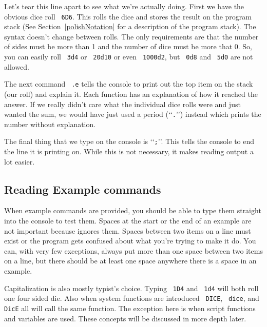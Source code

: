 Let's tear this line apart to see what we're actually doing. First we have
the obvious dice roll \texttt{ 6D6}. This rolls the dice and stores the result
on the program stack (See Section~\ref{polishNotation} for a description of
the program stack). The syntax doesn't change between rolls. The only 
requirements are that the number of sides must be more than 1
and the number of dice must
be more that 0. So, you can easily roll \texttt{ 3d4} or \texttt{ 20d10} or even
\texttt{ 1000d2}, but \texttt{ 0d8} and \texttt{ 5d0} are not allowed.

The next command \texttt{ .e}
tells the console to print out the top item on the stack (our roll)
and explain it. Each function has an explanation of how it reached the answer.
If we really didn't care what the individual dice rolls were and just wanted
the sum, we would have just used a period (\lq\lq\texttt{.}\rq\rq) instead which
prints the number without explanation.

The final thing that we type on the console is \lq\lq\texttt{;}\rq\rq. This tells
the console to end the line it is printing on. While this is not necessary, it
makes reading output a lot easier.

\subsection*{Reading Example commands}
When example commands are provided, you should be able to type them straight
into the console to test them. Spaces at the start or the end of an example
are not important because \progLogo ignores them. Spaces between two items on
a line must exist or the program gets confused  about what you're trying to
make it do. You can, with very few exceptions, always put more than one
space between two items on a line, but there should be at least one space
anywhere there is a space in an example.

Capitalization is also mostly typist's choice. Typing \texttt{ 1D4} and \texttt{ 1d4}
will both roll one four sided die. Also when system functions are introduced
\texttt{ DICE}, \texttt{ dice}, and \texttt{ DicE} all will call the same function.
The exception here is when script functions and variables are used.
These concepts will be discussed in more depth later.

